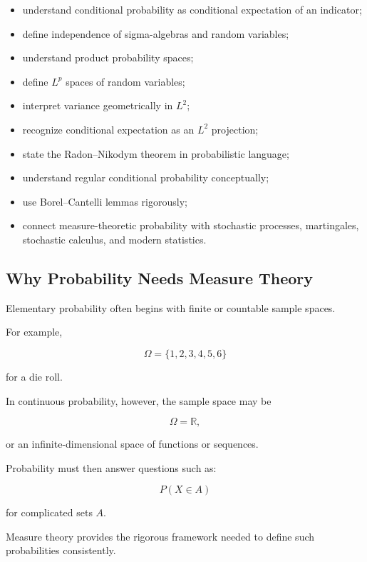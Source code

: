 {\begin{itemize}
    \item understand conditional probability as conditional expectation
          of an indicator;
    \item define independence of sigma-algebras and random variables;
    \item understand product probability spaces;
    \item define \(L^p\) spaces of random variables;
    \item interpret variance geometrically in \(L^2\);
    \item recognize conditional expectation as an \(L^2\) projection;
    \item state the Radon--Nikodym theorem in probabilistic language;
    \item understand regular conditional probability conceptually;
    \item use Borel--Cantelli lemmas rigorously;
    \item connect measure-theoretic probability with stochastic processes,
          martingales, stochastic calculus, and modern statistics.
\end{itemize}
}

\subsection{Why Probability Needs Measure Theory}
\label{subsec:why-probability-measure-theory}

Elementary probability often begins with finite or countable sample
spaces.

For example,

\[
\Omega
=
\{1,2,3,4,5,6\}
\]

for a die roll.

In continuous probability, however, the sample space may be

\[
\Omega
=
\mathbb{R},
\]

or an infinite-dimensional space of functions or sequences.

Probability must then answer questions such as:

\[
P(X\in A)
\]

for complicated sets \(A\).

Measure theory provides the rigorous framework needed to define such
probabilities consistently.

